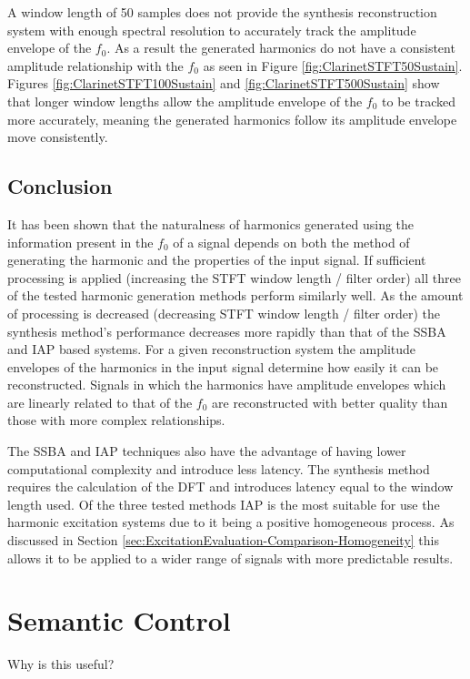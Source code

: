		A window length of 50 samples does not provide the synthesis reconstruction system with enough spectral
		resolution to accurately track the amplitude envelope of the $f_{0}$. As a result the generated harmonics
		do not have a consistent amplitude relationship with the $f_{0}$ as seen in Figure
		\ref{fig:ClarinetSTFT50Sustain}. Figures \ref{fig:ClarinetSTFT100Sustain} and
		\ref{fig:ClarinetSTFT500Sustain} show that longer window lengths allow the amplitude envelope of the
		$f_{0}$ to be tracked more accurately, meaning the generated harmonics follow its amplitude envelope move
		consistently.
		
	\subsection{Conclusion}
	\label{sec:PerceptualExperiments-Reconstruction-Conclusion}
		It has been shown that the naturalness of harmonics generated using the information present in the $f_{0}$
		of a signal depends on both the method of generating the harmonic and the properties of the input signal.
		If sufficient processing is applied (increasing the STFT window length / filter order) all three of the
		tested harmonic generation methods perform similarly well. As the amount of processing is decreased
		(decreasing STFT window length / filter order) the synthesis method's performance decreases more rapidly
		than that of the SSBA and IAP based systems. For a given reconstruction system the amplitude envelopes of
		the harmonics in the input signal determine how easily it can be reconstructed. Signals in which the
		harmonics have amplitude envelopes which are linearly related to that of the $f_{0}$ are reconstructed with
		better quality than those with more complex relationships.
		
		The SSBA and IAP techniques also have the advantage of having lower computational complexity and introduce
		less latency. The synthesis method requires the calculation of the DFT and introduces latency equal to the
		window length used. Of the three tested methods IAP is the most suitable for use the harmonic excitation
		systems due to it being a positive homogeneous process. As discussed in Section
		\ref{sec:ExcitationEvaluation-Comparison-Homogeneity} this allows it to be applied to a wider range of
		signals with more predictable results.

\section{Semantic Control}
\label{sec:PerceptualExperiments-SemanticControl}
	\note
	{
		Why is this useful?
	}

